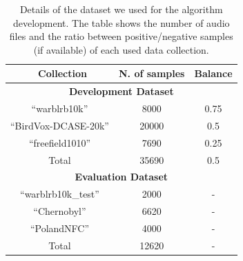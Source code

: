\begin{table}[t]
	\centering
	\begin{tabular}{|c|c|c|}
		\hline
		\ \textbf{Collection} \rule{0pt}{10pt} & \textbf{N. of samples}  & \textbf{Balance} \\
		\hline
		\hline	
		\multicolumn{3}{|c|}{\textbf{Development Dataset}  \rule{0pt}{10pt}} \\ 
		\hline
		``warblrb10k'' & 8000 & 0.75 \\
		\hline
		``BirdVox-DCASE-20k'' & 20000 & 0.5 \\
		\hline
		``freefield1010'' & 7690 & 0.25 \\
		\hline
		
		Total 	& 35690	& 0.5 \\
		
		\hline
		\hline
		
		\multicolumn{3}{|c|}{\textbf{Evaluation Dataset}  \rule{0pt}{10pt}} \\ 
		\hline
		``warblrb10k\_test'' & 2000 & - \\
		\hline
		``Chernobyl'' & 6620 & - \\
		\hline
		``PolandNFC'' & 4000 & - \\
		\hline
		Total 	& 12620 & - \\
		\hline
	\end{tabular}
	\caption[Bird Audio Detection - DCASE 2018 dataset]{Details of the dataset we used for the algorithm development. The table shows the number of audio files and the ratio between positive/negative samples (if available) of each used data collection.}
	\label{tab:dataset} 
\end{table}


